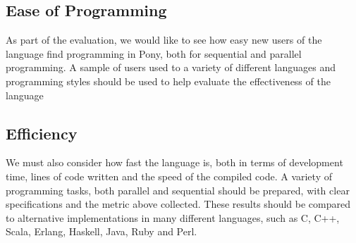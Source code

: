 \documentclass[pdftex,11pt,a4paper]{report}
\begin{document}
\subsection{Ease of Programming}

As part of the evaluation, we would like to see how easy new users of the language find programming in Pony, both for sequential and parallel programming.
A sample of users used to a variety of different languages and programming styles should be used to help evaluate the effectiveness of the language

\subsection{Efficiency}

We must also consider how fast the language is, both in terms of development time, lines of code written and the speed of the compiled code.
A variety of programming tasks, both parallel and sequential should be prepared, with clear specifications and the metric above collected.
These results should be compared to alternative implementations in many different languages, such as C, C++, Scala, Erlang, Haskell, Java, Ruby and Perl.



\end{document}
